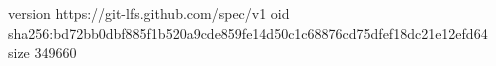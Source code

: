 version https://git-lfs.github.com/spec/v1
oid sha256:bd72bb0dbf885f1b520a9cde859fe14d50c1c68876cd75dfef18dc21e12efd64
size 349660
